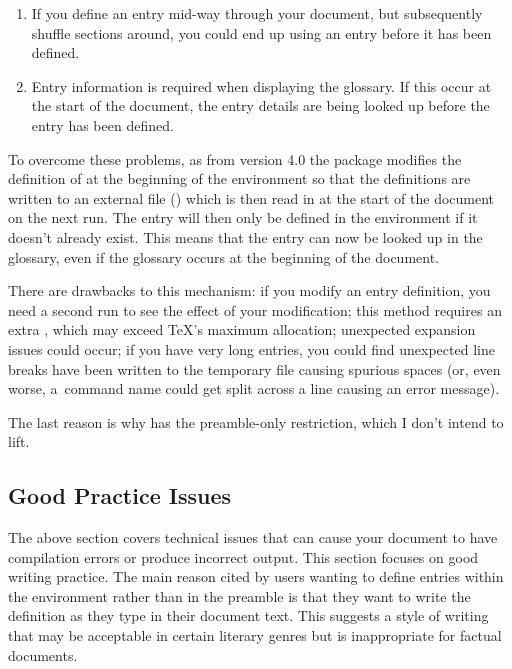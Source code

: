\documentclass[report,inlinetitle]{nlctdoc}
\begin{document}
\begin{enumerate}
 \item If you define an entry mid-way through your document, but
subsequently shuffle sections around, you could end up using an
entry before it has been defined.

 \item Entry information is required when displaying the glossary.
If this occur at the start of the document, the entry details are
being looked up before the entry has been defined.
\end{enumerate}

To overcome these problems, as from version 4.0 the
 package modifies the definition of
 at the beginning of the 
environment so that the definitions are written to an external file
() which is then read in at the start
of the document on the next run. The entry will then only be defined
in the  environment if it doesn't already exist. This
means that the entry can now be looked up in the glossary, even if
the glossary occurs at the beginning of the document.

There are drawbacks to this mechanism: if you modify an entry
definition, you need a second run to see the effect of your
modification; this method requires an extra , which may
exceed \TeX's maximum allocation; unexpected expansion issues could
occur; if you have very long entries, you could find unexpected line
breaks have been written to the temporary file causing spurious
spaces (or, even worse, a~command name could get split across a line
causing an error message).

The last reason is why  has the
preamble-only restriction, which I don't intend to lift.

\subsection{Good Practice Issues}
\label{sec:goodpractice}

The above section covers technical issues that can cause your document to have
compilation errors or produce incorrect output. This section
focuses on good writing practice. The main reason cited by users
wanting to define entries within the  environment rather
than in the preamble is that they want to write the definition as
they type in their document text. This suggests a  style of writing that may be acceptable in certain
literary genres but is inappropriate for factual documents.
\end{document}
